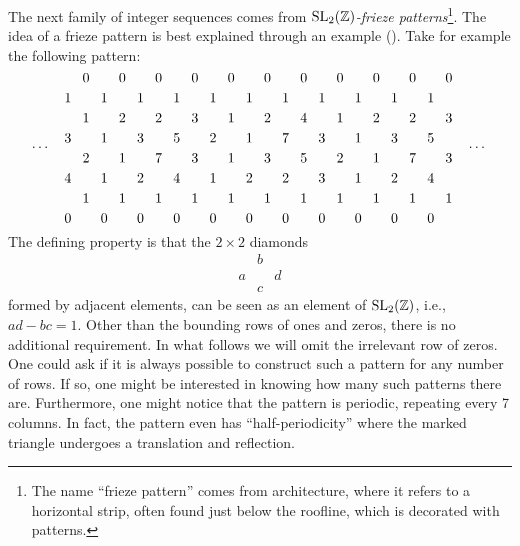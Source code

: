 \documentclass{article}
\begin{document}
The next family of integer sequences comes from \emph{$\operatorname{SL}_2(\mathbb{Z})$-frieze
	patterns}\footnote{The name ``frieze pattern'' comes from architecture, where it refers
	to a horizontal strip, often found just below the roofline, which is decorated with
	patterns.}. The idea of a frieze pattern is best explained
through an example (\cite{Coxeter1971FriezePatterns}). Take for example the following
pattern:
\begin{equation*}
	\dots\quad
	\begin{tikzcd}[
			sep = 0.2em, cramped,
		]
		&0&&0&&0&&0&&0&&0&&0&&0&&0&&0&&0\\
		1&&1&&1&&1&&1&&1&&1&&1&&1&&1&&1\\
		&1&&2&&2&&3&&1&&2&&4&&1&&2&&2&&3\\
		3&&1&&3&&5&&2&&1&&7&&3&&1&&3&&5\\
		&2&&1&&7&&3&&1&&3&&5&&2&&1&&7&&3\\
		4&&1&&2&&4&&1&&2&&2&&3&&1&&2&&4\\
		&1&&1&&1&&1&&1&&1&&1&&1&&1&&1&&1\\
		0&&0&&0&&0&&0&&0&&0&&0&&0&&0&&0
	\end{tikzcd}
	\quad
	\dots
\end{equation*}
The defining property is that the $2 \times 2$ diamonds
\begin{equation*}
	\begin{matrix}
		  & b &   \\
		a &   & d \\
		  & c &
	\end{matrix}
\end{equation*}
formed by adjacent elements, can be seen as an element of $\operatorname{SL}_2 (\mathbb{Z})$, i.e., $ad - bc = 1$. Other than the bounding rows of ones and zeros, there is no additional requirement. In what follows we will omit the irrelevant row of zeros. One could ask if it is always possible to construct such a pattern for any number of rows. If so, one might be interested in knowing how many such patterns there are. Furthermore, one might notice that the pattern is periodic, repeating every 7 columns. In fact, the pattern even has ``half-periodicity'' where the marked triangle undergoes a translation and reflection.
\end{document}
